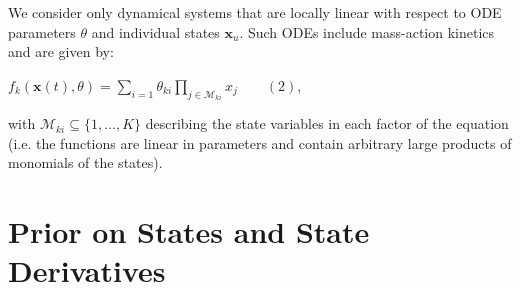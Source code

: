 \begin{par}
We consider only dynamical systems that are locally linear with respect to ODE parameters $\theta$ and individual states $\mathbf{x}_u$. Such ODEs include mass-action kinetics and are given by:
\end{par} \vspace{1em}
\begin{par}
$f_{k}(\mathbf{x}(t),\theta) = \sum_{i=1} \theta_{ki} \prod_{j \in \mathcal{M}_{ki}} x_j \qquad (2)$,
\end{par} \vspace{1em}
\begin{par}
with $\mathcal{M}_{ki} \subseteq \{ 1, \dots, K\}$ describing the state variables in each factor of the equation (i.e. the functions are linear in parameters and contain arbitrary large products of monomials of the states).
\end{par} \vspace{1em}

\section{Prior on States and State Derivatives}

